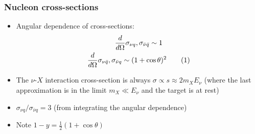 \documentclass[11pt]{article}
\newcommand\numberthis{\addtocounter{equation}{1}\tag{\theequation}}
\newcommand{\nubar}{{\bar{\nu}}}
\newcommand{\qbar}{{\bar{q}}}
\newcommand{\dd}[2]{\dfrac{d #1}{d #2}}
\begin{document}
\subsubsection{Nucleon cross-sections}
\begin{itemize}
  \item Angular dependence of cross-sections:
  \begin{gather*}
    \dd{}{\Omega} \sigma_{\nu q},\sigma_{\nubar \qbar} \sim 1\\
    \dd{}{\Omega} \sigma_{\nu \qbar},\sigma_{\nubar q} \sim (1+\cos\theta)^2\numberthis
  \end{gather*}
  \item The $\nu$-$X$ interaction cross-section is always $\sigma\propto s \approx 2 m_X E_\nu$ (where the last approximation is in the limit $m_X\ll E_\nu$ and the target is at rest)
  \item $\sigma_{\nu q} /\sigma_{\nubar q} = 3$ (from integrating the angular dependence)
  \item Note $1-y = \frac{1}{2}(1+\cos\theta)$
\end{itemize}
\end{document}
